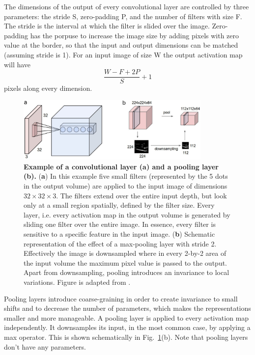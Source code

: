 The dimensions of the output of every convolutional layer are controlled by three parameters: the stride S, zero-padding P, and the number of filters with size F. The stride is the interval at which the filter is slided over the image. Zero-padding has the porpuse to increase the image size by adding pixels with zero value at the border, so that the input and output dimensions can be matched (assuming stride is 1). For an input image of size W the output activation map will have
\begin{equation}
\frac{W - F +2P}{S} + 1
\end{equation}
pixels along every dimension. 

\begin{figure}[h!]
	\centering
	\captionsetup{width=1\linewidth}
	\includegraphics[width=0.85\textwidth]{Figures/conv_pooling.pdf}
	\caption{\textbf{Example of a convolutional layer (a) and a pooling layer (b).} (\textbf{a}) In this example five small filters (represented by the 5 dots in the output volume) are applied to the input image of dimensions $32\times32\times3$. The filters extend over the entire input depth, but look only at a small region spatially, defined by the filter size. Every layer, i.e. every activation map in the output volume is generated by sliding one filter over the entire image. In essence, every filter is sensitive to a specific feature in the input image. (\textbf{b}) Schematic representation of the effect of a max-pooling layer with stride 2. Effectively the image is downsampled where in every 2-by-2 area of the input volume the maximum pixel value is passed to the output. Apart from downsampling, pooling introduces an invariance to local variations. Figure is adapted from \parencite{cs231}.
}
	\label{fig:conv_pooling}
\end{figure}

Pooling layers introduce coarse-graining in order to create invariance to small shifts and to decrease the number of parameters, which makes the representations smaller and more manageable. A pooling layer is applied to every activation map independently. It downsamples its input, in the most common case, by applying a max operator. This is shown schematically in Fig.~\ref{fig:conv_pooling}(b). Note that pooling layers don't have any parameters.

